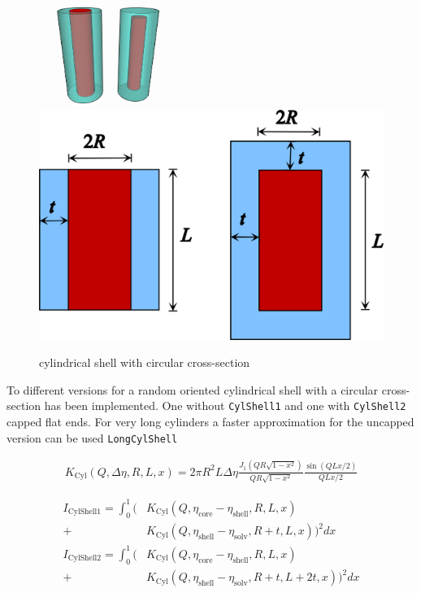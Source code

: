 \begin{figure}[htb]
\begin{center}
\includegraphics[width=0.4\textwidth]{../images/form_factor/cylindrical_obj/CylShell.png}
\hspace{0.1\textwidth}
\includegraphics[width=.4\textwidth]{../images/form_factor/cylindrical_obj/cylshell2D.png}
\end{center}
\caption{cylindrical shell with circular cross-section}
\label{cylshell}
\end{figure}

To different versions for a random oriented cylindrical shell with a
circular cross-section has been implemented. One without  \texttt{CylShell1}
and one with \texttt{CylShell2} capped flat ends. For very long cylinders a faster
approximation for the uncapped version can be used \texttt{LongCylShell}

\begin{align}
K_\text{Cyl}(Q,\Delta\eta,R,L,x) =
2 \pi R^2 L \Delta \eta
    \frac{J_1\left(Q R \sqrt{1-x^2}\right)}{Q R \sqrt{1-x^2}}
    \frac{\sin(Q L x/2)}{QL x/2}
\end{align}

\begin{align}
I_\text{CylShell1} =
\int_0^1 \biggl(
  &
  K_\text{Cyl}\left(Q,\eta_\text{core}-\eta_\text{shell},R,L,x\right) \\
+&  K_\text{Cyl}\left(Q,\eta_\text{shell}-\eta_\text{solv},R+t,L,x\right)
\biggr)^2 dx \nonumber \\
I_\text{CylShell2} =
\int_0^1 \biggl(
 &  K_\text{Cyl}\left(Q,\eta_\text{core}-\eta_\text{shell},R,L,x\right) \\
+&  K_\text{Cyl}\left(Q,\eta_\text{shell}-\eta_\text{solv},R+t,L+2t,x\right)
\biggr)^2 dx \nonumber
\end{align}

